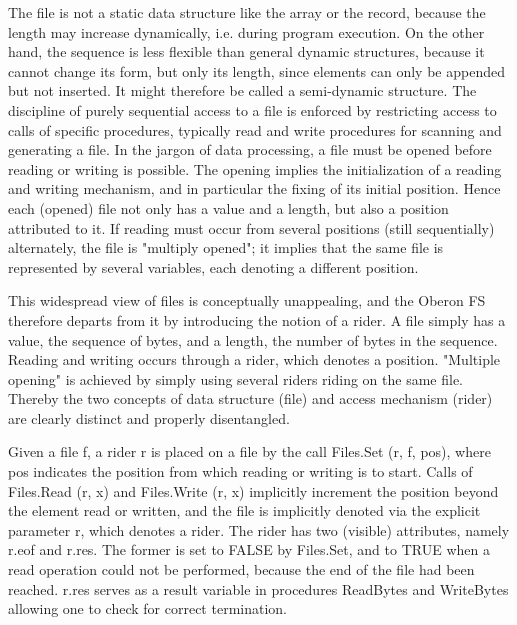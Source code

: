 The file is not a static data structure like the array or the record, because the length may increase
dynamically, i.e. during program execution. On the other hand, the sequence is less flexible than
general dynamic structures, because it cannot change its form, but only its length, since elements
can only be appended but not inserted. It might therefore be called a semi-dynamic structure.
The discipline of purely sequential access to a file is enforced by restricting access to calls of
specific procedures, typically read and write procedures for scanning and generating a file. In the
jargon of data processing, a file must be opened before reading or writing is possible. The
opening implies the initialization of a reading and writing mechanism, and in particular the fixing of
its initial position. Hence each (opened) file not only has a value and a length, but also a position
attributed to it. If reading must occur from several positions (still sequentially) alternately, the file
is "multiply opened"; it implies that the same file is represented by several variables, each
denoting a different position.

This widespread view of files is conceptually unappealing, and the Oberon FS therefore
departs from it by introducing the notion of a rider. A file simply has a value, the sequence of
bytes, and a length, the number of bytes in the sequence. Reading and writing occurs through a
rider, which denotes a position. "Multiple opening" is achieved by simply using several riders
riding on the same file. Thereby the two concepts of data structure (file) and access mechanism
(rider) are clearly distinct and properly disentangled.

Given a file f, a rider r is placed on a file by the call Files.Set (r, f, pos), where pos indicates the
position from which reading or writing is to start. Calls of Files.Read (r, x) and Files.Write (r, x)
implicitly increment the position beyond the element read or written, and the file is implicitly
denoted via the explicit parameter r, which denotes a rider. The rider has two (visible) attributes,
namely r.eof and r.res. The former is set to FALSE by Files.Set, and to TRUE when a read
operation could not be performed, because the end of the file had been reached. r.res serves as
a result variable in procedures ReadBytes and WriteBytes allowing one to check for correct
termination.

